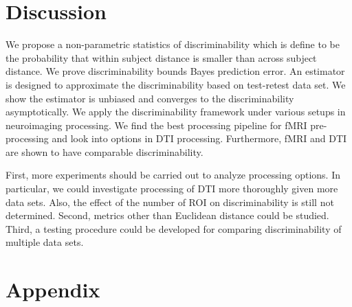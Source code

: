 \documentclass{article}
\begin{document}
\section{Discussion}

 We propose a non-parametric statistics of discriminability which is define to be the probability that within subject distance is smaller than across subject distance.  We prove discriminability bounds Bayes prediction error. An estimator is designed to approximate the discriminability based on test-retest data set. We show the estimator is unbiased and converges to the discriminability asymptotically. We apply the discriminability framework under various setups in neuroimaging processing. We find the best processing pipeline for fMRI pre-processing and look into options in DTI processing. Furthermore, fMRI and DTI are shown to have comparable discriminability.



 First, more experiments should be carried out to analyze processing options. In particular, we could investigate processing of DTI more thoroughly given more data sets. Also, the effect of the number of ROI on discriminability is still not determined. Second, metrics other than Euclidean distance could be studied. Third, a testing procedure could be developed for comparing discriminability of multiple data sets.



\section{Appendix}


% 
% 
% 
% 
% 
% 
% 
% 
\end{document}
